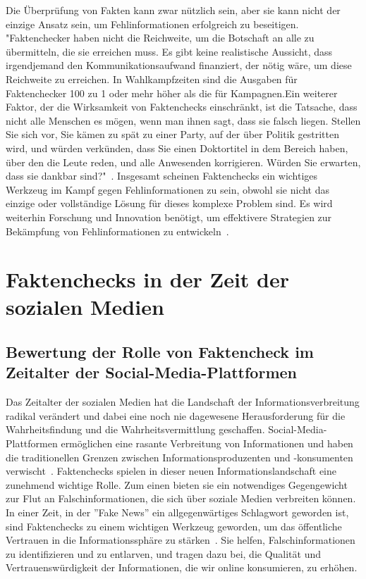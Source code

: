 \documentclass[a4paper,listof=totoc,bibliography=totoc]{scrartcl}
\begin{document}
Die Überprüfung von Fakten kann zwar nützlich sein, 
aber sie kann nicht der einzige Ansatz sein, um Fehlinformationen erfolgreich zu beseitigen. "Faktenchecker haben nicht die Reichweite, um die Botschaft an alle zu übermitteln, die 
sie erreichen muss. Es gibt keine realistische Aussicht, dass irgendjemand den Kommunikationsaufwand finanziert, der nötig wäre, um diese Reichweite zu erreichen. In Wahlkampfzeiten 
sind die Ausgaben für Faktenchecker 100 zu 1 oder mehr höher als die für Kampagnen.Ein weiterer Faktor, der die Wirksamkeit von Faktenchecks einschränkt, ist die Tatsache, dass 
nicht alle Menschen es mögen, wenn man ihnen sagt, dass sie falsch liegen. Stellen Sie sich vor, Sie kämen zu spät zu einer Party, auf der über Politik gestritten wird, und würden 
verkünden, dass Sie einen Doktortitel in dem Bereich haben, über den die Leute reden, und alle Anwesenden korrigieren. Würden Sie erwarten, dass sie dankbar sind?"~\cite{FullFact:2019}. 
Insgesamt scheinen Faktenchecks ein wichtiges Werkzeug im Kampf gegen Fehlinformationen zu sein, obwohl sie nicht das einzige oder vollständige Lösung für dieses 
komplexe Problem sind. Es wird weiterhin Forschung und Innovation benötigt, um effektivere Strategien zur Bekämpfung von Fehlinformationen zu entwickeln~\cite{lewandowsky2020}.

\section{Faktenchecks in der Zeit der sozialen Medien}

\subsection{Bewertung der Rolle von Faktencheck im Zeitalter der Social-Media-Plattformen}

Das Zeitalter der sozialen Medien hat die Landschaft der Informationsverbreitung radikal verändert und dabei eine noch nie dagewesene Herausforderung 
für die Wahrheitsfindung und die Wahrheitsvermittlung geschaffen. Social-Media-Plattformen ermöglichen eine rasante Verbreitung von Informationen und 
haben die traditionellen Grenzen zwischen Informationsproduzenten und -konsumenten verwischt~\cite{Vosoughi2018}. Faktenchecks spielen in dieser neuen 
Informationslandschaft eine zunehmend wichtige Rolle.
Zum einen bieten sie ein notwendiges Gegengewicht zur Flut an Falschinformationen, die sich über soziale Medien verbreiten können. In einer Zeit, in 
der ''Fake News'' ein allgegenwärtiges Schlagwort geworden ist, sind Faktenchecks zu einem wichtigen Werkzeug geworden, um das öffentliche Vertrauen 
in die Informationssphäre zu stärken~\cite{lewandowsky2020}. Sie helfen, Falschinformationen zu identifizieren und zu entlarven, und tragen dazu bei, 
die Qualität und Vertrauenswürdigkeit der Informationen, die wir online konsumieren, zu erhöhen.
\end{document}
